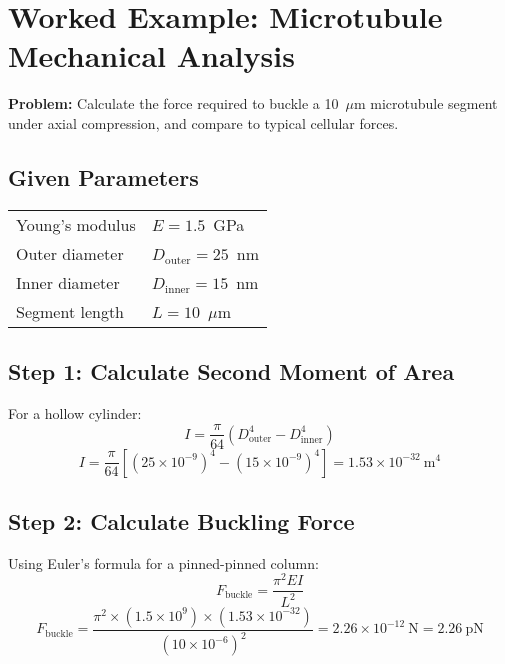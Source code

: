 \section{Worked Example: Microtubule Mechanical Analysis}

\textbf{Problem:} Calculate the force required to buckle a 10~$\mu$m microtubule segment under axial compression, and compare to typical cellular forces.

\subsection*{Given Parameters}

\begin{tabular}{@{}ll@{}}
Young's modulus & $E = 1.5$~GPa \\
Outer diameter & $D_{\mathrm{outer}} = 25$~nm \\
Inner diameter & $D_{\mathrm{inner}} = 15$~nm \\
Segment length & $L = 10$~$\mu$m \\
\end{tabular}

\subsection*{Step 1: Calculate Second Moment of Area}

For a hollow cylinder:
\begin{equation}
I = \frac{\pi}{64}(D_{\mathrm{outer}}^4 - D_{\mathrm{inner}}^4)
\end{equation}
\begin{equation}
I = \frac{\pi}{64}[(25 \times 10^{-9})^4 - (15 \times 10^{-9})^4] = 1.53 \times 10^{-32}\ \mathrm{m}^4
\end{equation}

\subsection*{Step 2: Calculate Buckling Force}

Using Euler's formula for a pinned-pinned column:
\begin{equation}
F_{\mathrm{buckle}} = \frac{\pi^2 EI}{L^2}
\end{equation}
\begin{equation}
F_{\mathrm{buckle}} = \frac{\pi^2 \times (1.5 \times 10^9) \times (1.53 \times 10^{-32})}{(10 \times 10^{-6})^2} = 2.26 \times 10^{-12}\ \mathrm{N} = 2.26\ \mathrm{pN}
\end{equation}

